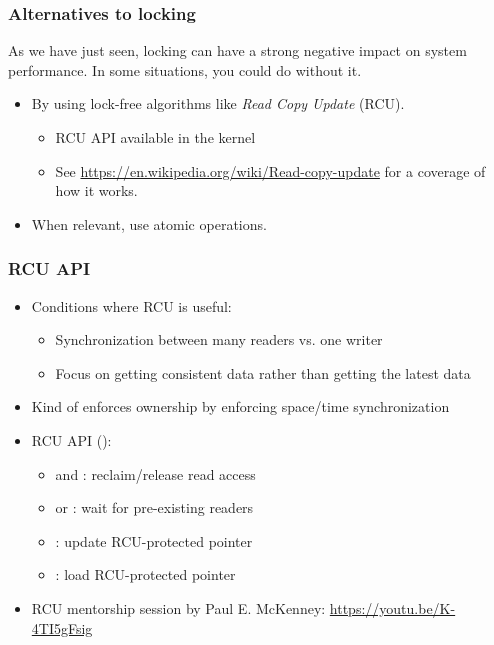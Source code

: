 \begin{frame}
  \frametitle{Alternatives to locking}
  As we have just seen, locking can have a strong negative
  impact on system performance. In some situations, you could do
  without it.
  \begin{itemize}
  \item By using lock-free algorithms like \emph{Read Copy Update}
    (RCU).
    \begin{itemize}
    \item RCU API available in the kernel
    \item See \url{https://en.wikipedia.org/wiki/Read-copy-update} for a
      coverage of how it works.
    \end{itemize}
  \item When relevant, use atomic operations.
  \end{itemize}
\end{frame}

\begin{frame}[fragile]
  \frametitle{RCU API}
  \begin{itemize}
  \item Conditions where RCU is useful:
    \begin{itemize}
    \item Synchronization between many readers vs. one writer
    \item Focus on getting consistent data rather than getting the
      latest data
    \end{itemize}
  \item Kind of enforces ownership by enforcing space/time synchronization
  \item RCU API ():
    \begin{itemize}
    \item {} and :
      reclaim/release read access
    \item {} or : wait for
      pre-existing readers
    \item {}: update RCU-protected pointer
    \item {}: load RCU-protected pointer
    \end{itemize}
  \item RCU mentorship session by Paul E. McKenney:
    \url{https://youtu.be/K-4TI5gFsig}
  \end{itemize}
\end{frame}

